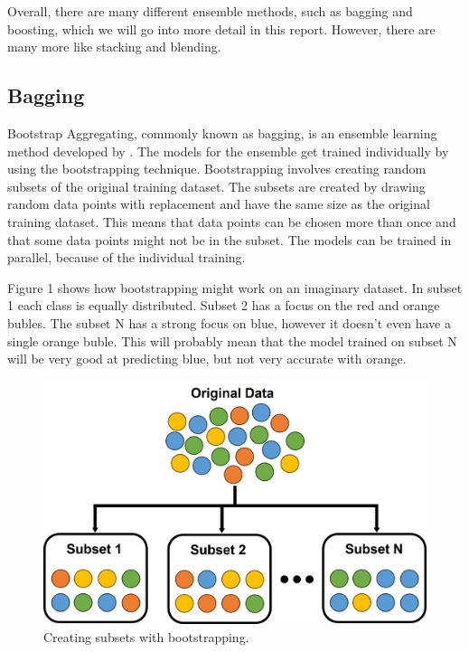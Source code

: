 Overall, there are many different ensemble methods, such as bagging and boosting, 
which we will go into more detail in this report. However, there are many more 
like stacking and blending.


\subsection{Bagging}

Bootstrap Aggregating, commonly known as bagging, is an ensemble learning method
developed by \citet*{Breiman1996}. The models for the ensemble get trained individually
by using the bootstrapping technique. Bootstrapping involves creating random
subsets of the original training dataset. The subsets are created by drawing 
random data points with replacement and have the same size as the original
training dataset. This means that data points can be chosen more than once and
that some data points might not be in the subset. The models can be trained in
parallel, because of the individual training.


Figure 1 shows how bootstrapping might work on an imaginary dataset. In subset 1
each class is equally distributed. Subset 2 has a focus on the red and orange bubles.
The subset N has a strong focus on blue, however it doesn't even have a single 
orange buble. This will probably mean that the model trained on subset N will be very
good at predicting blue, but not very accurate with orange.

\begin{figure}[htbp]
    \centering
    \includegraphics[width=.5\textwidth]{figures/bootstrapping}
    \caption{Creating subsets with bootstrapping.}
\end{figure}

